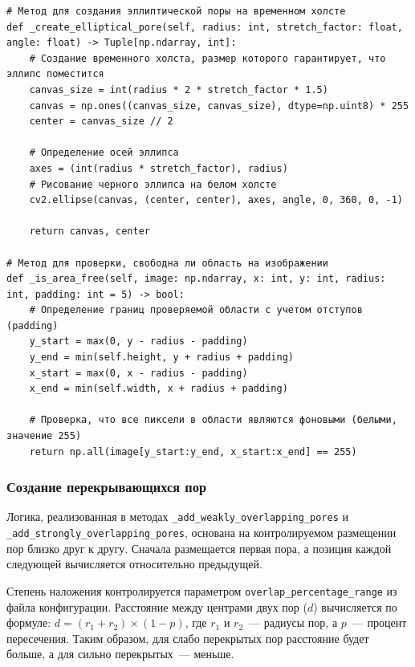 \documentclass[code]{wordcore}
\begin{document}
\begin{code}
\begin{verbatim}
# Метод для создания эллиптической поры на временном холсте
def _create_elliptical_pore(self, radius: int, stretch_factor: float, angle: float) -> Tuple[np.ndarray, int]:
    # Создание временного холста, размер которого гарантирует, что эллипс поместится
    canvas_size = int(radius * 2 * stretch_factor * 1.5)
    canvas = np.ones((canvas_size, canvas_size), dtype=np.uint8) * 255
    center = canvas_size // 2

    # Определение осей эллипса
    axes = (int(radius * stretch_factor), radius)
    # Рисование черного эллипса на белом холсте
    cv2.ellipse(canvas, (center, center), axes, angle, 0, 360, 0, -1)

    return canvas, center

# Метод для проверки, свободна ли область на изображении
def _is_area_free(self, image: np.ndarray, x: int, y: int, radius: int, padding: int = 5) -> bool:
    # Определение границ проверяемой области с учетом отступов (padding)
    y_start = max(0, y - radius - padding)
    y_end = min(self.height, y + radius + padding)
    x_start = max(0, x - radius - padding)
    x_end = min(self.width, x + radius + padding)

    # Проверка, что все пиксели в области являются фоновыми (белыми, значение 255)
    return np.all(image[y_start:y_end, x_start:x_end] == 255)
  \end{verbatim}
\end{code}

\subsubsection{Создание перекрывающихся пор}

Логика, реализованная в методах \texttt{\_add\_weakly\_overlapping\_pores} и \texttt{\_add\-\_strongly\_overlapping\_pores}, основана на контролируемом размещении пор близко друг к другу. Сначала размещается первая пора, а позиция каждой следующей вычисляется относительно предыдущей.

Степень наложения контролируется параметром \texttt{overlap\_percentage\_range} из файла конфигурации. Расстояние между центрами двух пор (\(d\)) вычисляется по формуле: \( d = (r_1 + r_2) \times (1 - p) \), где \(r_1\) и \(r_2\)~--- радиусы пор, а \(p\)~--- процент пересечения. Таким образом, для слабо перекрытых пор расстояние будет больше, а для сильно перекрытых~--- меньше.
\end{document}
